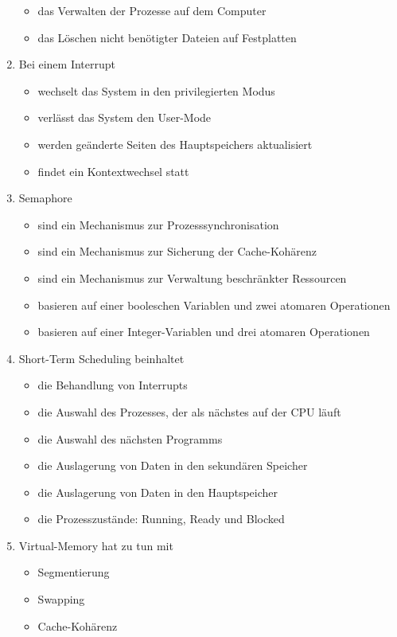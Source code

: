\documentclass{exercisesheet}
\begin{document}
\begin{enumerate}
\begin{itemize}
          \item das Verwalten der Prozesse auf dem Computer \solution{\checkmark}
          \item das Löschen nicht benötigter Dateien auf Festplatten \solution{\xmark}
        \end{itemize}
  \item Bei einem Interrupt
        \begin{itemize}
          \item wechselt das System in den privilegierten Modus \solution{\checkmark}
          \item verlässt das System den User-Mode \solution{\checkmark}
          \item werden geänderte Seiten des Hauptspeichers aktualisiert \solution{\xmark}
          \item findet ein Kontextwechsel statt \solution{\checkmark}
        \end{itemize}
  \item Semaphore
        \begin{itemize}
          \item sind ein Mechanismus zur Prozesssynchronisation \solution{\checkmark}
          \item sind ein Mechanismus zur Sicherung der Cache-Kohärenz \solution{\xmark}
          \item sind ein Mechanismus zur Verwaltung beschränkter Ressourcen \solution{\checkmark}
          \item basieren auf einer booleschen Variablen und zwei atomaren Operationen \solution{\xmark}
          \item basieren auf einer Integer-Variablen und drei atomaren Operationen \solution{\checkmark}
        \end{itemize}
  \item Short-Term Scheduling beinhaltet
        \begin{itemize}
          \item die Behandlung von Interrupts \solution{\checkmark}
          \item die Auswahl des Prozesses, der als nächstes auf der CPU läuft \solution{\checkmark}
          \item die Auswahl des nächsten Programms \solution{\xmark}
          \item die Auslagerung von Daten in den sekundären Speicher \solution{\xmark}
          \item die Auslagerung von Daten in den Hauptspeicher \solution{\xmark}
          \item die Prozesszustände: Running, Ready und Blocked \solution{\checkmark}
        \end{itemize}
  \item Virtual-Memory hat zu tun mit
        \begin{itemize}
          \item Segmentierung \solution{\checkmark}
          \item Swapping \solution{\checkmark}
          \item Cache-Kohärenz \solution{\xmark}
        \end{itemize}
\end{enumerate}
\end{document}
